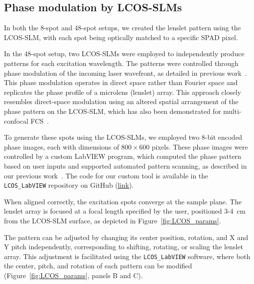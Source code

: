 \subsection{Phase modulation by LCOS-SLMs}
\label{sec:LCOS}

In both the 8-spot and 48-spot setups, we created the lenslet pattern using the \ac{LCOS-SLM}, with each spot being optically matched to a specific \ac{SPAD} pixel. 

In the 48-spot setup, two \ac{LCOS-SLM}s were employed to independently produce patterns for each excitation wavelength. 
The patterns were controlled through phase modulation of the incoming laser wavefront, as detailed in previous work~\cite{ingargiola_PLOS1_2016, colyer_BOE_2010}. 
This phase modulation operates in direct space rather than Fourier space and replicates the phase profile of a microlens (lenslet) array.
This approach closely resembles direct-space modulation using an altered spatial arrangement of the phase pattern on the \ac{LCOS-SLM}, which has also been demonstrated for multi-confocal \ac{FCS}~\cite{kloster-landsberg_RSI_2013}.

To generate these spots using the \ac{LCOS-SLM}s, we employed two 8-bit encoded phase images, each with dimensions of $800\times600$ pixels. 
These phase images were controlled by a custom LabVIEW program, which computed the phase pattern based on user inputs and supported automated pattern scanning, as described in our previous work~\cite{ingargiola_JCP_2018}. 
The code for our custom tool is available in the \texttt{LCOS\_LabVIEW} repository on GitHub (\href{https://github.com/multispot-software/LCOS_LabVIEW}{link}).

When aligned correctly, the excitation spots converge at the sample plane. 
The lenslet array is focused at a focal length specified by the user, positioned 3-4~cm from the \ac{LCOS-SLM} surface, as depicted in Figure~\ref{fig:LCOS_params}. 

The pattern can be adjusted by changing its center position, rotation, and X and Y pitch independently, corresponding to shifting, rotating, or scaling the lenslet array. 
This adjustment is facilitated using the \texttt{LCOS\_LabVIEW} software, where both the center, pitch, and rotation of each pattern can be modified (Figure~\ref{fig:LCOS_params}, panels B and C).

